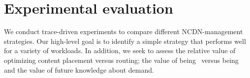 
\section{Experimental evaluation}
\label{sec:ncdn-eval}


We conduct trace-driven experiments to compare different NCDN-management strategies. Our high-level goal is to identify a simple strategy that performs well for a variety of workloads. In addition, we seek to assess the relative value of optimizing content placement versus routing; the value of being \planned\ versus being \unplanned\; and the value of  future knowledge about demand.








